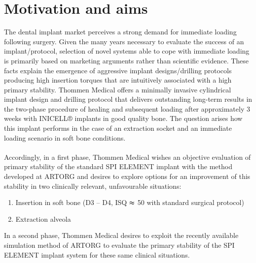 \documentclass[12pt, a4paper, twoside]{report}
\begin{document}
\section{Motivation and aims}
%
The dental implant market perceives a strong demand for immediate loading following surgery.
Given the many years necessary to evaluate the success of an implant/protocol, selection of novel systems able to cope with immediate loading is primarily based on marketing arguments rather than scientific evidence. These facts explain the emergence of aggressive implant designs/drilling protocols producing high insertion torques that are intuitively associated with a high primary stability. Thommen Medical offers a minimally invasive cylindrical implant design and drilling protocol that delivers outstanding long-term results in the two-phase procedure of healing and subsequent loading after approximately 3 weeks with INICELL® implants in good quality bone. The question arises how this implant performs in the case of an extraction socket and an immediate loading scenario in soft bone conditions.\\
\\
Accordingly, in a first phase, Thommen Medical wishes an objective evaluation of primary stability of the standard SPI ELEMENT implant with the method developed at ARTORG and desires to explore options for an improvement of this stability in two clinically relevant, unfavourable situations:
%
\begin{enumerate}
\item Insertion in soft bone (D3 – D4, ISQ $\thickapprox$ 50 with standard surgical protocol)
\item Extraction alveola
\end{enumerate}
In a second phase, Thommen Medical desires to exploit the recently available simulation method of ARTORG to evaluate the primary stability of the SPI ELEMENT implant system for these same clinical situations.
%
%
%
%
%
\newpage
%
%
\end{document}
